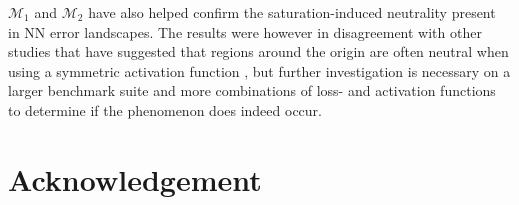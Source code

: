 \documentclass[conference]{IEEEtran}
\begin{document}
${\mathcal{M}_1}$ and ${\mathcal{M}_2}$ have also helped confirm the saturation-induced neutrality present in NN error landscapes. The results were however in disagreement with other studies that have suggested that regions around the origin are often neutral when using a symmetric activation function \cite{lecun2012efficient}, but further investigation is necessary on a larger benchmark suite and more combinations of loss- and activation functions to determine if the phenomenon does indeed occur.

\section*{Acknowledgement}

%
%



%
%
\end{document}
